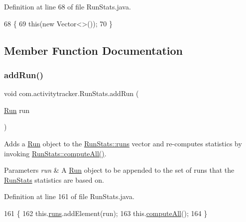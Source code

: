 Definition at line 68 of file Run\+Stats.\+java.


\begin{DoxyCode}
68                \{
69         \textcolor{keyword}{this}(\textcolor{keyword}{new} Vector<>());
70     \}
\end{DoxyCode}


\subsection{Member Function Documentation}
\mbox{\label{classcom_1_1activitytracker_1_1_run_stats_a1b00f177e7c4abc155bb03c6a8b5d7dd}} 
\subsubsection{\texorpdfstring{add\+Run()}{addRun()}}
{\footnotesize\ttfamily void com.\+activitytracker.\+Run\+Stats.\+add\+Run (\begin{DoxyParamCaption}\item[{\mbox{\hyperlink{classcom_1_1activitytracker_1_1_run}{Run}}}]{run }\end{DoxyParamCaption})}

Adds a \mbox{\hyperlink{classcom_1_1activitytracker_1_1_run}{Run}} object to the \mbox{\hyperlink{classcom_1_1activitytracker_1_1_run_stats_a0fd429e9f463ddf4897c507c0e3c0a12}{Run\+Stats\+::runs}} vector and re-\/computes statistics by invoking \mbox{\hyperlink{classcom_1_1activitytracker_1_1_run_stats_a85018dbaae7a08213d443a0697e59ee4}{Run\+Stats\+::compute\+All()}}.


\begin{DoxyParams}{Parameters}
{\em run} & A \mbox{\hyperlink{classcom_1_1activitytracker_1_1_run}{Run}} object to be appended to the set of runs that the \mbox{\hyperlink{classcom_1_1activitytracker_1_1_run_stats}{Run\+Stats}} statistics are based on. \\
\hline
\end{DoxyParams}


Definition at line 161 of file Run\+Stats.\+java.


\begin{DoxyCode}
161                                 \{
162         this.\mbox{\hyperlink{classcom_1_1activitytracker_1_1_run_stats_a0fd429e9f463ddf4897c507c0e3c0a12}{runs}}.addElement(run);
163         this.\mbox{\hyperlink{classcom_1_1activitytracker_1_1_run_stats_a85018dbaae7a08213d443a0697e59ee4}{computeAll}}();
164     \}
\end{DoxyCode}
\mbox{\label{classcom_1_1activitytracker_1_1_run_stats_ac73cb94cc8ff604fe446d9a327e420cc}} 
